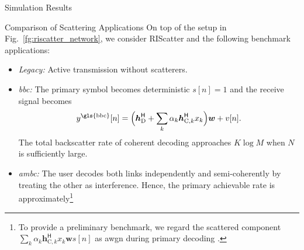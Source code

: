 \documentclass[journal]{IEEEtran}
\begin{document}
\begin{section}{Simulation Results}
	\begin{subsection}{Comparison of Scattering Applications}
		On top of the setup in Fig.~\ref{fg:riscatter_network}, we consider RIScatter and the following benchmark applications:
		\begin{itemize}
			\item \emph{Legacy:} Active transmission without scatterers.
			\item \emph{\gls{bbc}:} The primary symbol becomes deterministic $s[n]=1$ and the receive signal becomes
			\begin{equation}
				y^{\text{\gls{bbc}}}[n] = \Bigl(\boldsymbol{h}_{\text{D}}^\mathsf{H} + \sum_{k} \alpha_k \boldsymbol{h}_{\text{C},k}^\mathsf{H} x_k\Bigr) \boldsymbol{w} + v[n].
			\end{equation}
			The total backscatter rate of coherent decoding approaches $K \log M$ when $N$ is sufficiently large.
			\item \emph{\gls{ambc}:} The user decodes both links independently and semi-coherently by treating the other as interference.
			Hence, the primary achievable rate is approximately\footnote{To provide a preliminary benchmark, we regard the scattered component $\sum_{k} \alpha_k \boldsymbol{h}_{\text{C},k}^\mathsf{H} x_k \boldsymbol{w}s[n]$ as \gls{awgn} during primary decoding \cite{Long2020a}.}

\end{itemize}
\end{subsection}
\end{section}
\end{document}
